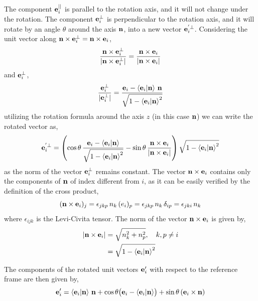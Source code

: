\documentclass[12pt]{article}
\begin{document}
The component $\vb{e}_i^{||}$ is parallel to the rotation axis, and it will not change under
the rotation. The component $\vb{e}_i^{\perp}$ is perpendicular to the rotation axis, and it
will rotate by an angle $\theta$ around the axis $\vb{n}$, into a new vector
$\vb{e}_i^{'\perp}$. Considering the unit vector along
$\vb{n} \times \vb{e}_i^{\perp} = \vb{n} \times \vb{e}_i$,
\begin{equation}
  \frac{\vb{n} \times \vb{e}_i^{\perp}}{|\vb{n} \times \vb{e}_i^{\perp}|}
  = \frac{\vb{n} \times \vb{e}_i}{|\vb{n} \times \vb{e}_i|}
\end{equation}
and $\vb{e}_i^{\perp}$,
\begin{equation}
  \frac{\vb{e}_i^{\perp}}{|\vb{e}_i^{\perp}|}
  = \frac{\vb{e}_i - \ip{\vb{e}_i}{\vb{n}}\,\vb{n}}{\sqrt{1 - \ip{\vb{e}_i}{\vb{n}}^2}}
\end{equation}
utilizing the rotation formula around the axis $z$ (in this case $\vb{n}$) we can write the
rotated vector as,
\begin{equation}
  \vb{e}_i^{'\perp} =
  \left(
    \cos\theta\,\frac{\vb{e}_i - \ip{\vb{e}_i}{\vb{n}}}{\sqrt{1 - \ip{\vb{e}_i}{\vb{n}}^2}}
    - \sin\theta\,\frac{\vb{n} \times \vb{e}_i}{|\vb{n} \times \vb{e}_i|}
  \right)\sqrt{1 - \ip{\vb{e}_i}{\vb{n}}^2}
\end{equation}
as the norm of the vector $\vb{e}_i^{\perp}$ remains constant. The vector
$\vb{n} \times \vb{e}_i$ contains only the components of $\vb{n}$ of index different from
$i$, as it can be easily verified by the definition of the cross product,
\begin{equation}
  (\vb{n} \times \vb{e}_i)_j = \epsilon_{jkp}\, n_k\,(e_i)_p = \epsilon_{jkp}\, n_k\,\delta_{ip} = \epsilon_{jki}\, n_k
\end{equation}
where $\epsilon_{ijk}$ is the Levi-Civita tensor. The norm of the vector $\vb{n} \times \vb{e}_i$ is given by,
\begin{align}
  |\vb{n} \times \vb{e}_i| &= \sqrt{n_k^2 + n_p^2}, \quad k, p \neq i \\
                            &= \sqrt{1 - \ip{\vb{e}_i}{\vb{n}}^2}
\end{align}

The components of the rotated unit vectors $\vb{e}'_i$ with respect to the reference frame
are then given by,
\begin{equation}
  \vb{e}'_i = \ip{\vb{e}_i}{\vb{n}}\,\vb{n}
    + \cos\theta\bigl(\vb{e}_i - \ip{\vb{e}_i}{\vb{n}}\bigr)
    + \sin\theta\,(\vb{e}_i \times \vb{n})
\end{equation}
\end{document}
